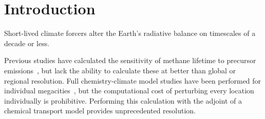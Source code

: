 \section{Introduction}

Short-lived climate forcers alter the Earth's radiative balance on timescales of a decade or less.

Previous studies have calculated the sensitivity of methane lifetime to precursor emissions~\citep{ref:holmes2013}, but lack the ability to calculate these at better than global or regional resolution. Full chemistry-climate model studies have been performed for individual megacities~\citep{ref:dang2015}, but the computational cost of perturbing every location individually is prohibitive. Performing this calculation with the adjoint of a chemical transport model provides unprecedented resolution.